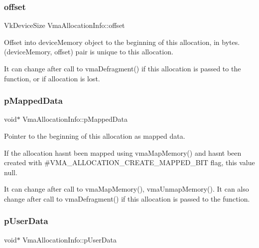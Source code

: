 \subsubsection{\texorpdfstring{offset}{offset}}
{\footnotesize\ttfamily Vk\+Device\+Size Vma\+Allocation\+Info\+::offset}



Offset into device\+Memory object to the beginning of this allocation, in bytes. (device\+Memory, offset) pair is unique to this allocation. 

It can change after call to vma\+Defragment() if this allocation is passed to the function, or if allocation is lost. \mbox{\label{structVmaAllocationInfo_a5eeffbe2d2f30f53370ff14aefbadbe2}} 
\subsubsection{\texorpdfstring{p\+Mapped\+Data}{pMappedData}}
{\footnotesize\ttfamily void$\ast$ Vma\+Allocation\+Info\+::p\+Mapped\+Data}



Pointer to the beginning of this allocation as mapped data. 

If the allocation hasn\textquotesingle{}t been mapped using vma\+Map\+Memory() and hasn\textquotesingle{}t been created with \#\+V\+M\+A\+\_\+\+A\+L\+L\+O\+C\+A\+T\+I\+O\+N\+\_\+\+C\+R\+E\+A\+T\+E\+\_\+\+M\+A\+P\+P\+E\+D\+\_\+\+B\+IT flag, this value null.

It can change after call to vma\+Map\+Memory(), vma\+Unmap\+Memory(). It can also change after call to vma\+Defragment() if this allocation is passed to the function. \mbox{\label{structVmaAllocationInfo_adc507656149c04de7ed95d0042ba2a13}} 
\subsubsection{\texorpdfstring{p\+User\+Data}{pUserData}}
{\footnotesize\ttfamily void$\ast$ Vma\+Allocation\+Info\+::p\+User\+Data}




